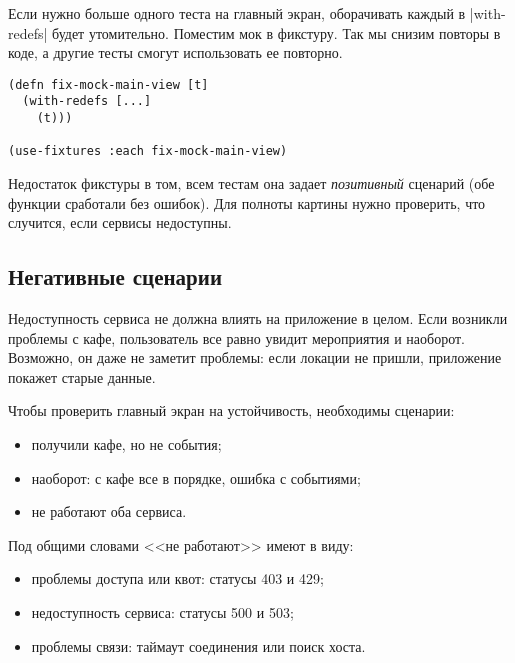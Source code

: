 Если нужно больше одного теста на главный экран, оборачивать каждый в
\spverb|with-redefs| будет утомительно. Поместим мок в фикстуру. Так мы снизим
повторы в коде, а другие тесты смогут использовать ее повторно.

\begin{verbatim}
(defn fix-mock-main-view [t]
  (with-redefs [...]
    (t)))

(use-fixtures :each fix-mock-main-view)
\end{verbatim}

Недостаток фикстуры в том, всем тестам она задает \emph{позитивный} сценарий
(обе функции сработали без ошибок). Для полноты картины нужно проверить, что
случится, если сервисы недоступны.

\subsection{Негативные сценарии}

Недоступность сервиса не должна влиять на приложение в целом. Если возникли
проблемы с кафе, пользователь все равно увидит мероприятия и наоборот. Возможно,
он даже не заметит проблемы: если локации не пришли, приложение покажет старые
данные.

Чтобы проверить главный экран на устойчивость, необходимы сценарии:

\begin{itemize}

\item
  получили кафе, но не события;

\item
  наоборот: с кафе все в порядке, ошибка с событиями;

\item
  не работают оба сервиса.

\end{itemize}

Под общими словами <<не работают>> имеют в виду:


\begin{itemize}

\item
  проблемы доступа или квот: статусы 403 и 429;

\item
  недоступность сервиса: статусы 500 и 503;

\item
  проблемы связи: таймаут соединения или поиск хоста.

\end{itemize}

